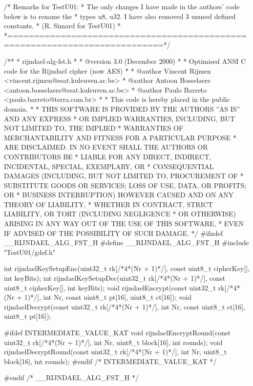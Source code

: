 \code
/*                       Remarks for TestU01:
 * The only changes I have made in the authors' code below is to rename the
 * types u8, u32. I have also removed 3 unused defined constants.
 * (R. Simard for TestU01)
 *
 *===========================================================================*/
 
/**
 * rijndael-alg-fst.h
 *
 * @version 3.0 (December 2000)
 *
 * Optimised ANSI C code for the Rijndael cipher (now AES)
 *
 * @author Vincent Rijmen <vincent.rijmen@esat.kuleuven.ac.be>
 * @author Antoon Bosselaers <antoon.bosselaers@esat.kuleuven.ac.be>
 * @author Paulo Barreto <paulo.barreto@terra.com.br>
 *
 * This code is hereby placed in the public domain.
 *
 * THIS SOFTWARE IS PROVIDED BY THE AUTHORS ''AS IS'' AND ANY EXPRESS
 * OR IMPLIED WARRANTIES, INCLUDING, BUT NOT LIMITED TO, THE IMPLIED
 * WARRANTIES OF MERCHANTABILITY AND FITNESS FOR A PARTICULAR PURPOSE
 * ARE DISCLAIMED.  IN NO EVENT SHALL THE AUTHORS OR CONTRIBUTORS BE
 * LIABLE FOR ANY DIRECT, INDIRECT, INCIDENTAL, SPECIAL, EXEMPLARY, OR
 * CONSEQUENTIAL DAMAGES (INCLUDING, BUT NOT LIMITED TO, PROCUREMENT OF
 * SUBSTITUTE GOODS OR SERVICES; LOSS OF USE, DATA, OR PROFITS; OR
 * BUSINESS INTERRUPTION) HOWEVER CAUSED AND ON ANY THEORY OF LIABILITY,
 * WHETHER IN CONTRACT, STRICT LIABILITY, OR TORT (INCLUDING NEGLIGENCE
 * OR OTHERWISE) ARISING IN ANY WAY OUT OF THE USE OF THIS SOFTWARE,
 * EVEN IF ADVISED OF THE POSSIBILITY OF SUCH DAMAGE.
 */
#ifndef __RIJNDAEL_ALG_FST_H
#define __RIJNDAEL_ALG_FST_H
#include "TestU01/gdef.h"


int rijndaelKeySetupEnc(uint32_t rk[/*4*(Nr + 1)*/], const uint8_t cipherKey[], int keyBits);
int rijndaelKeySetupDec(uint32_t rk[/*4*(Nr + 1)*/], const uint8_t cipherKey[], int keyBits);
void rijndaelEncrypt(const uint32_t rk[/*4*(Nr + 1)*/], int Nr, const uint8_t pt[16], uint8_t ct[16]);
void rijndaelDecrypt(const uint32_t rk[/*4*(Nr + 1)*/], int Nr, const uint8_t ct[16], uint8_t pt[16]);

#ifdef INTERMEDIATE_VALUE_KAT
void rijndaelEncryptRound(const uint32_t rk[/*4*(Nr + 1)*/], int Nr, uint8_t block[16], int rounds);
void rijndaelDecryptRound(const uint32_t rk[/*4*(Nr + 1)*/], int Nr, uint8_t block[16], int rounds);
#endif /* INTERMEDIATE_VALUE_KAT */

#endif /* __RIJNDAEL_ALG_FST_H */
\endcode
